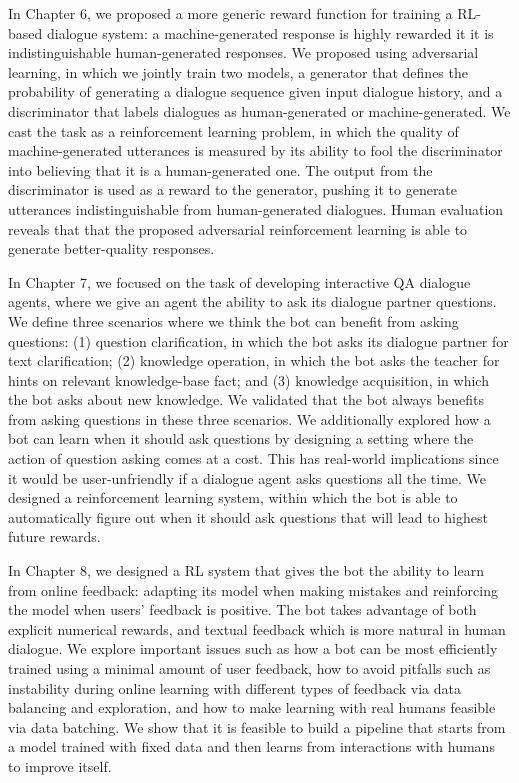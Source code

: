 In Chapter 6, we proposed a more generic reward function for training a RL-based dialogue system: a
machine-generated
 response is highly rewarded it it is
indistinguishable human-generated responses. 
We proposed  using adversarial learning, in which we jointly train two models, 
a generator that defines the probability of generating a dialogue sequence given input dialogue history, and 
a discriminator
that labels dialogues as human-generated or machine-generated. 
We cast the task as a reinforcement learning problem, in which the quality of machine-generated utterances is measured by its ability to fool the discriminator into believing that it is a human-generated one. The output from the discriminator is used as a reward to the generator, pushing it to generate 
utterances indistinguishable from human-generated dialogues. 
Human evaluation reveals that that the proposed adversarial reinforcement learning is able to generate better-quality responses. 

In Chapter 7, we focused on the task of developing interactive QA dialogue agents, where we give  an agent the ability to ask its dialogue partner questions. 
We define three scenarios where we think the bot can benefit from asking questions:
(1) question clarification, in which the bot asks its dialogue partner for text clarification; (2) knowledge operation, in which the bot asks the teacher for hints on relevant knowledge-base fact; and (3)
knowledge acquisition, in which the bot asks about new knowledge. 
We validated that the bot always benefits from asking questions in these three scenarios. 
We additionally explored how a bot can learn when it should ask questions by designing a setting where the action of question asking comes at a cost. 
This has real-world implications since it would be  user-unfriendly if a dialogue agent asks questions all the time. 
We designed a reinforcement learning system, within which the bot is able to automatically figure out when it should ask questions that will lead to highest future rewards.


In Chapter 8, we designed a RL system that gives the bot the ability to learn from online feedback: adapting its model when making mistakes and reinforcing the model when users' feedback is positive.  
The bot takes advantage of both explicit numerical rewards, and textual feedback which is more natural in human dialogue. 
We explore important issues such as how a bot can be most efficiently trained using a minimal amount of user feedback, how to avoid pitfalls such as instability during online learning with different types of feedback via data balancing and exploration, and how to make learning with real humans feasible via data batching.
We show that it is feasible to build a pipeline that starts from a model trained with fixed data and then learns from interactions with humans to improve itself. 

